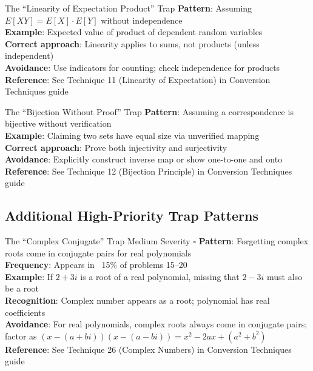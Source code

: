 \documentclass{article}
\begin{document}
\begin{trapbox}{The ``Linearity of Expectation Product'' Trap}
\textbf{Pattern}: Assuming $E[XY] = E[X] \cdot E[Y]$ without independence\\
\textbf{Example}: Expected value of product of dependent random variables\\
\textbf{Correct approach}: Linearity applies to sums, not products (unless independent)\\
\textbf{Avoidance}: Use indicators for counting; check independence for products\\
\textbf{Reference}: See Technique 11 (Linearity of Expectation) in Conversion Techniques guide
\end{trapbox}

\begin{trapbox}{The ``Bijection Without Proof'' Trap}
\textbf{Pattern}: Assuming a correspondence is bijective without verification\\
\textbf{Example}: Claiming two sets have equal size via unverified mapping\\
\textbf{Correct approach}: Prove both injectivity and surjectivity\\
\textbf{Avoidance}: Explicitly construct inverse map or show one-to-one and onto\\
\textbf{Reference}: See Technique 12 (Bijection Principle) in Conversion Techniques guide
\end{trapbox}

\subsection{Additional High-Priority Trap Patterns}

\begin{trapbox}{The ``Complex Conjugate'' Trap \colorbox{orange!20}{Medium Severity} $\square$}
\textbf{Pattern}: Forgetting complex roots come in conjugate pairs for real polynomials\\
\textbf{Frequency}: Appears in ~15\% of problems 15--20\\
\textbf{Example}: If $2+3i$ is a root of a real polynomial, missing that $2-3i$ must also be a root\\
\textbf{Recognition}: Complex number appears as a root; polynomial has real coefficients\\
\textbf{Avoidance}: For real polynomials, complex roots always come in conjugate pairs; factor as $(x-(a+bi))(x-(a-bi)) = x^2-2ax+(a^2+b^2)$\\
\textbf{Reference}: See Technique 26 (Complex Numbers) in Conversion Techniques guide
\end{trapbox}
\end{document}
